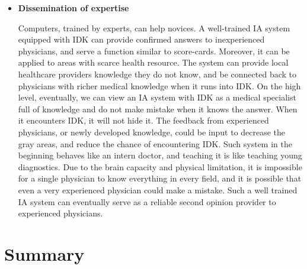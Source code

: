 \documentclass[11pt]{pnas-new}
\begin{document}
\begin{itemize}
  
\item {\bf Dissemination of expertise}

Computers, trained by experts, can help novices. {\color{blue}A well-trained IA system equipped with IDK can provide confirmed answers to inexperienced physicians, and} serve a function
similar to score-cards{\color{blue}. Moreover, it can be applied to areas with scarce health resource. The system can provide local healthcare providers knowledge they do not know, and be connected back to physicians with richer medical knowledge when it runs into IDK.
On the high level, eventually, we can view an IA system with IDK as a medical specialist full of knowledge and do not make mistake when it knows the answer. When it encounters IDK, it will not hide it. The feedback from experienced physicians, or newly developed knowledge, could be input to decrease the gray areas, and reduce the chance of encountering IDK. Such system in the beginning behaves like an intern doctor, and teaching it is like}
teaching young diagnostics. {\color{blue}Due to the brain capacity and physical limitation, it is impossible for a single physician to know everything in every field, and it is possible that even a very experienced physician could make a mistake. Such a well trained IA system can eventually serve as a reliable second opinion provider to experienced physicians.}
\end{itemize}

\section{Summary}

% 

\end{document}
